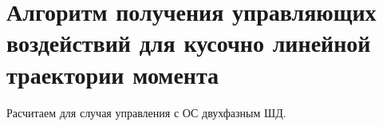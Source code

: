 \newpage
\part{ Алгоритм получения управляющих воздействий для кусочно линейной траектории момента }

Расчитаем для случая управления с ОС двухфазным ШД. 
